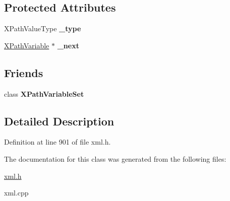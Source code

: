 \subsection*{Protected Attributes}
\begin{DoxyCompactItemize}
\item 
\hypertarget{classphys_1_1xml_1_1XPathVariable_a039fe72ced3d55be346498846eb29d85}{
XPathValueType {\bfseries \_\-type}}
\label{df/dee/classphys_1_1xml_1_1XPathVariable_a039fe72ced3d55be346498846eb29d85}

\item 
\hypertarget{classphys_1_1xml_1_1XPathVariable_a5425c11d82b053db83a70c0dcb84ea98}{
\hyperlink{classphys_1_1xml_1_1XPathVariable}{XPathVariable} $\ast$ {\bfseries \_\-next}}
\label{df/dee/classphys_1_1xml_1_1XPathVariable_a5425c11d82b053db83a70c0dcb84ea98}

\end{DoxyCompactItemize}
\subsection*{Friends}
\begin{DoxyCompactItemize}
\item 
\hypertarget{classphys_1_1xml_1_1XPathVariable_a6d8e28205e67fa0164160dd3cb547fe6}{
class {\bfseries XPathVariableSet}}
\label{df/dee/classphys_1_1xml_1_1XPathVariable_a6d8e28205e67fa0164160dd3cb547fe6}

\end{DoxyCompactItemize}


\subsection{Detailed Description}


Definition at line 901 of file xml.h.



The documentation for this class was generated from the following files:\begin{DoxyCompactItemize}
\item 
\hyperlink{xml_8h}{xml.h}\item 
xml.cpp\end{DoxyCompactItemize}
